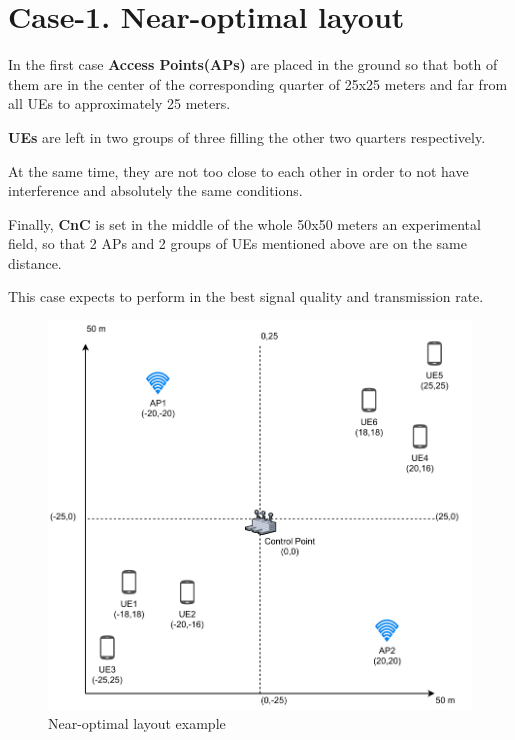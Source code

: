 \section{Case-1. Near-optimal layout}\label{case-1.-sub-optimal-layout}

In the first case \textbf{Access Points(APs)} are placed in the ground
so that both of them are in the center of the corresponding quarter of
25x25 meters and far from all UEs to approximately 25 meters.

\textbf{UEs} are left in two groups of three filling the other two
quarters respectively.

At the same time, they are not too close to each other in order to not
have interference and absolutely the same conditions.

Finally, \textbf{CnC} is set in the middle of the whole 50x50 meters an
experimental field, so that 2 APs and 2 groups of UEs mentioned above
are on the same distance.

This case expects to perform in the best signal quality and transmission
rate.

\begin{figure}[H]
	\centering
	\includegraphics[width=\linewidth,keepaspectratio]{images/05-cases-description-Near-Optimal.pdf}
\caption{Near-optimal layout example}
\end{figure}
